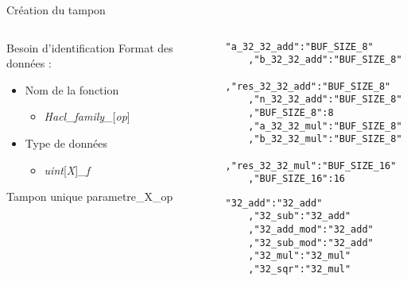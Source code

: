 \documentclass[A4,svgnames,9pt,aspectratio=169]{beamer}
\begin{document}

\begin{frame}[fragile]{Création du tampon}
\begin{columns}
  \begin{column}{0.4\textwidth}
    \begin{minipage}[t][8cm][t]{\linewidth}
      \begin{block}{Besoin d'identification}
        Format des données :
        \begin{itemize}
          \item Nom de la fonction
          \begin{itemize}
            \item \textit{Hacl\_family\_}[\textit{op}]
          \end{itemize}
          \item Type de données
          \begin{itemize}
            \item \textit{uint}[\textit{X}]\textit{\_f}
          \end{itemize}
        \end{itemize}
      \end{block}
      \pause
      \begin{block}{Tampon unique}
        parametre\_X\_op  
      \end{block}
    \end{minipage}
  \end{column}
  \begin{column}{0.6\textwidth}
    \begin{minipage}[t][10cm][t]{\linewidth}
      \begin{lstlisting}[style=CStyle, caption={matching.json}]
    "a_32_32_add":"BUF_SIZE_8"
    ,"b_32_32_add":"BUF_SIZE_8"
    ,"res_32_32_add":"BUF_SIZE_8"
    ,"n_32_32_add":"BUF_SIZE_8"
    ,"BUF_SIZE_8":8
    ,"a_32_32_mul":"BUF_SIZE_8"
    ,"b_32_32_mul":"BUF_SIZE_8"
    ,"res_32_32_mul":"BUF_SIZE_16"
    ,"BUF_SIZE_16":16
      \end{lstlisting}

      \begin{lstlisting}[style=CStyle, caption={twin.json}]
    "32_add":"32_add"
    ,"32_sub":"32_add"
    ,"32_add_mod":"32_add"
    ,"32_sub_mod":"32_add"
    ,"32_mul":"32_mul"
    ,"32_sqr":"32_mul"
      \end{lstlisting}
    \end{minipage}
  \end{column}
\end{columns}
  
\end{frame}
\end{document}

